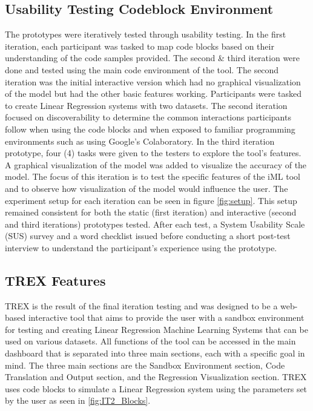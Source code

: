 \documentclass{sigchi-ext}
\begin{document}
\subsection{Usability Testing Codeblock Environment}
The prototypes were iteratively tested through usability testing. In the first iteration, each participant was tasked to map code blocks based on their understanding of the code samples provided. The second \& third iteration were done and tested using the main code environment of the tool. The second iteration was the initial interactive version which had no graphical visualization of the model but had the other basic features working. 
Participants were tasked to create Linear Regression systems with two datasets. The second iteration focused on discoverability to determine the common interactions participants follow when using the code blocks and when exposed to familiar programming environments such as using Google's Colaboratory. 
In the third iteration prototype, four (4) tasks were given to the testers to explore the tool's features. A graphical visualization of the model was added to visualize the accuracy of the model. The focus of this iteration is to test the specific features of the iML tool and to observe how visualization of the model would influence the user. The experiment setup for each iteration can be seen in figure \ref{fig:setup}. This setup remained consistent for both the static (first iteration) and interactive (second and third iterations) prototypes tested. 
After each test, a System Usability Scale (SUS) survey and a word checklist  issued before conducting a short post-test interview to understand the participant's experience using the prototype. 

\subsection{TREX Features}
TREX is the result of the final iteration testing and was designed to be a web-based interactive tool that aims to provide the user with a sandbox environment for testing and creating Linear Regression Machine Learning Systems that can be used on various datasets. All functions of the tool can be accessed in the main dashboard that is separated into three main sections, each with a specific goal in mind. The three main sections are the Sandbox Environment section, Code Translation and Output section, and the Regression Visualization section. TREX uses code blocks to simulate a Linear Regression system using the parameters set by the user as seen in \ref{fig:IT2_Blocks}. 
\end{document}
